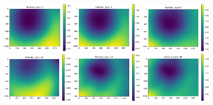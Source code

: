 \documentclass[letterpaper,11pt]{article}
\begin{document}
\begin{figure}[!ht]
\centering
\includegraphics[width=0.32\textwidth]{images/results/flatfield_layers_vectra/flatfield_layer_1}
\includegraphics[width=0.32\textwidth]{images/results/flatfield_layers_vectra/flatfield_layer_5}
\includegraphics[width=0.32\textwidth]{images/results/flatfield_layers_vectra/flatfield_layer_9}
\includegraphics[width=0.32\textwidth]{images/results/flatfield_layers_vectra/flatfield_layer_10}
\includegraphics[width=0.32\textwidth]{images/results/flatfield_layers_vectra/flatfield_layer_14}
\includegraphics[width=0.32\textwidth]{images/results/flatfield_layers_vectra/flatfield_layer_18}

\end{figure}
\end{document}
